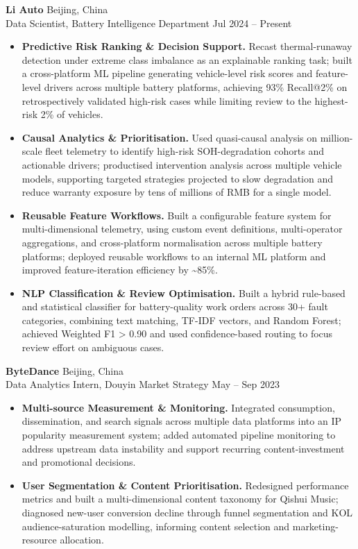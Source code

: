 \documentclass[a4paper,10pt]{article}
\begin{document}
\noindent\textbf{Li Auto} \hfill Beijing, China\\
Data Scientist, Battery Intelligence Department \hfill Jul 2024 -- Present
\begin{itemize}
    \item \textbf{Predictive Risk Ranking \& Decision Support.} Recast thermal-runaway detection under extreme class imbalance as an explainable ranking task; built a cross-platform ML pipeline generating vehicle-level risk scores and feature-level drivers across multiple battery platforms, achieving 93\% Recall@2\% on retrospectively validated high-risk cases while limiting review to the highest-risk 2\% of vehicles.

    \item \textbf{Causal Analytics \& Prioritisation.} Used quasi-causal analysis on million-scale fleet telemetry to identify high-risk SOH-degradation cohorts and actionable drivers; productised intervention analysis across multiple vehicle models, supporting targeted strategies projected to slow degradation and reduce warranty exposure by tens of millions of RMB for a single model.

    \item \textbf{Reusable Feature Workflows.} Built a configurable feature system for multi-dimensional telemetry, using custom event definitions, multi-operator aggregations, and cross-platform normalisation across multiple battery platforms; deployed reusable workflows to an internal ML platform and improved feature-iteration efficiency by \textasciitilde85\%.

    \item \textbf{NLP Classification \& Review Optimisation.} Built a hybrid rule-based and statistical classifier for battery-quality work orders across 30+ fault categories, combining text matching, TF-IDF vectors, and Random Forest; achieved Weighted F1 > 0.90 and used confidence-based routing to focus review effort on ambiguous cases.
\end{itemize}

\vspace{2pt}
\noindent\textbf{ByteDance} \hfill Beijing, China\\
Data Analytics Intern, Douyin Market Strategy \hfill May -- Sep 2023
\begin{itemize}
    \item \textbf{Multi-source Measurement \& Monitoring.} Integrated consumption, dissemination, and search signals across multiple data platforms into an IP popularity measurement system; added automated pipeline monitoring to address upstream data instability and support recurring content-investment and promotional decisions.

    \item \textbf{User Segmentation \& Content Prioritisation.} Redesigned performance metrics and built a multi-dimensional content taxonomy for Qishui Music; diagnosed new-user conversion decline through funnel segmentation and KOL audience-saturation modelling, informing content selection and marketing-resource allocation.
\end{itemize}
\end{document}
